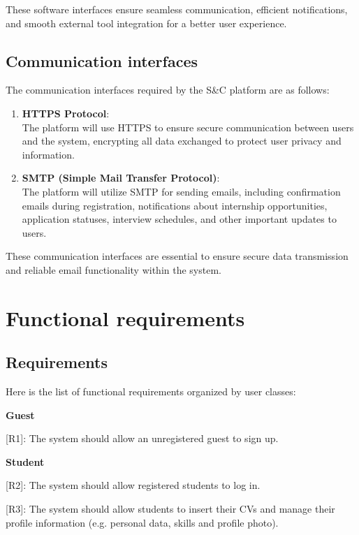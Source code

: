 These software interfaces ensure seamless communication, efficient
notifications, and smooth external tool integration for a better user
experience.


\subsection{Communication interfaces}
\label{subsec:communication_interfaces}%


The communication interfaces required by the S\&C platform are as
follows:

\begin{enumerate}
\def\labelenumi{\arabic{enumi}.}
\item
  \textbf{HTTPS Protocol}:\\
  The platform will use HTTPS to ensure secure communication between
  users and the system, encrypting all data exchanged to protect user
  privacy and information.
\item
  \textbf{SMTP (Simple Mail Transfer Protocol)}:\\
  The platform will utilize SMTP for sending emails, including
  confirmation emails during registration, notifications about
  internship opportunities, application statuses, interview schedules,
  and other important updates to users.
\end{enumerate}

These communication interfaces are essential to ensure secure data
transmission and reliable email functionality within the system.


\section{Functional requirements}
\label{sec:functional_requirements}%


\subsection{Requirements}
\label{subsec:requirements}%


Here is the list of functional requirements organized by user classes:


\textbf{Guest}

{[}R1{]}: The system should allow an unregistered guest to sign up.

\textbf{Student}

{[}R2{]}: The system should allow registered students to log in.

{[}R3{]}: The system should allow students to insert their CVs and
manage their profile information (e.g. personal data, skills and profile
photo).

